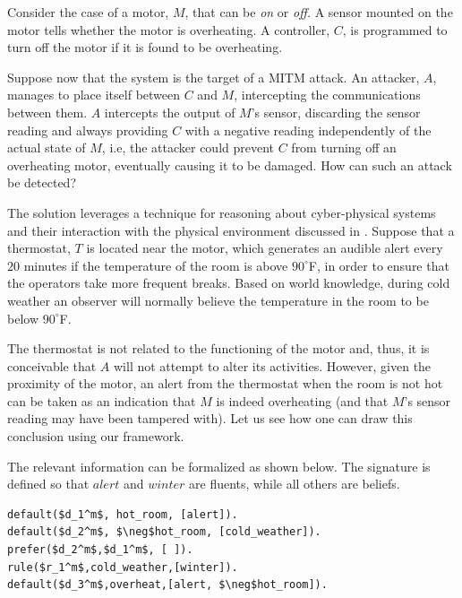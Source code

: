 \documentclass{article}
\begin{document}
Consider the case of a motor, $M$, that can be \emph{on} or \emph{off.} A sensor mounted on the motor tells whether the motor is overheating. A controller, $C$, is programmed to turn off the motor if it is found to be overheating.

Suppose now that the system is the target of a MITM attack. An attacker, $A$, manages to place itself between $C$ and $M$, intercepting the communications between them. $A$ intercepts the output of $M$'s sensor, discarding the sensor reading and always providing $C$ with a negative reading independently of the actual state of $M$, i.e, %
the attacker could prevent $C$ from turning off an overheating motor, eventually causing it to be %
damaged. How can such an attack be detected?

The solution leverages a technique for reasoning about cyber-physical systems and their interaction with the physical environment discussed in \cite{nb15}. Suppose that a thermostat, $T$ is  located near the motor,  which generates an audible alert every $20$ minutes if the temperature of the room is above $90^\circ$F, in order to ensure that the operators take more frequent breaks. Based on world knowledge, during cold weather an observer will normally believe the temperature in the room to be below $90^\circ$F.
 

The thermostat is not related to the functioning of the motor and, thus, it is conceivable that $A$ will not attempt to alter its activities.
However, given the proximity of the motor, an alert from the thermostat when the room is not hot can be taken as an indication that $M$ is indeed overheating (and that $M$'s sensor reading may have been tampered with). Let us see how one can draw this conclusion using our framework.

The relevant information can be formalized as shown below. The signature is defined so that $alert$ and $winter$ are fluents, while all others are beliefs. %

%
\begin{lstlisting}[language=clingo,caption=Relevant Information, label=lst:pi_M, mathescape=true,xleftmargin=.01\textwidth, breaklines=true]
default($d_1^m$, hot_room, [alert]). 
default($d_2^m$, $\neg$hot_room, [cold_weather]). 
prefer($d_2^m$,$d_1^m$, [ ]). 
rule($r_1^m$,cold_weather,[winter]). 
default($d_3^m$,overheat,[alert, $\neg$hot_room]).
\end{lstlisting}
\end{document}
